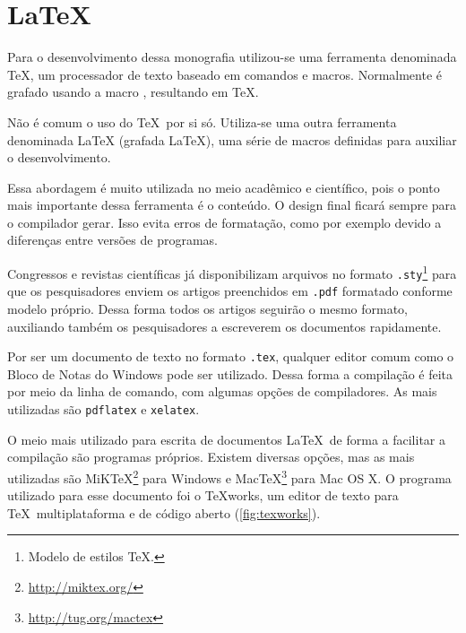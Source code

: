 
\chapter{LaTeX}\label{ap:latex}

Para o desenvolvimento dessa monografia utilizou-se uma ferramenta denominada TeX, um processador de texto baseado em comandos e macros. Normalmente é grafado usando a macro \texttt{\detokenize{\TeX}}, resultando em \TeX. 

Não é comum o uso do \TeX\ por si só. Utiliza-se uma outra ferramenta denominada LaTeX (grafada \LaTeX), uma série de macros definidas para auxiliar o desenvolvimento.

Essa abordagem é muito utilizada no meio acadêmico e científico, pois o ponto mais importante dessa ferramenta é o conteúdo. O design final ficará sempre para o compilador gerar. Isso evita erros de formatação, como por exemplo devido a diferenças entre versões de programas.

Congressos e revistas científicas já disponibilizam arquivos no formato \texttt{.sty}\footnote{Modelo de estilos \TeX.} para que os pesquisadores enviem os artigos preenchidos em \texttt{.pdf} formatado conforme modelo próprio. Dessa forma todos os artigos seguirão o mesmo formato, auxiliando também os pesquisadores a escreverem os documentos rapidamente.

Por ser um documento de texto no formato \texttt{.tex}, qualquer editor comum como o Bloco de Notas do Windows pode ser utilizado. Dessa forma a compilação é feita por meio da linha de comando, com algumas opções de compiladores. As mais utilizadas são \texttt{pdflatex} e \texttt{xelatex}.

O meio mais utilizado para escrita de documentos \LaTeX\ de forma a facilitar a compilação são programas próprios. Existem diversas opções, mas as mais utilizadas são MiKTeX\footnote{\url{http://miktex.org/}} para Windows e MacTeX\footnote{\url{http://tug.org/mactex}} para Mac OS X. O programa utilizado para esse documento foi o TeXworks, um editor de texto para \TeX\ multiplataforma e de código aberto (\autoref{fig:texworks}).

